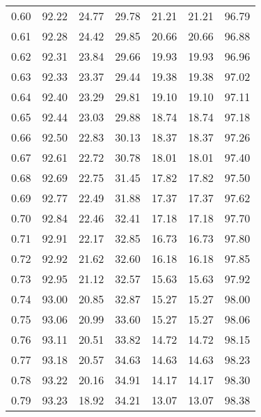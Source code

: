 \begin{tabular}{|c|c|c|c|c|c|c|}
      0.60 &     92.22 &     24.77 &      29.78 &   21.21 &      21.21 &         96.79 \\
      0.61 &     92.28 &     24.42 &      29.85 &   20.66 &      20.66 &         96.88 \\
      0.62 &     92.31 &     23.84 &      29.66 &   19.93 &      19.93 &         96.96 \\
      0.63 &     92.33 &     23.37 &      29.44 &   19.38 &      19.38 &         97.02 \\
      0.64 &     92.40 &     23.29 &      29.81 &   19.10 &      19.10 &         97.11 \\
      0.65 &     92.44 &     23.03 &      29.88 &   18.74 &      18.74 &         97.18 \\
      0.66 &     92.50 &     22.83 &      30.13 &   18.37 &      18.37 &         97.26 \\
      0.67 &     92.61 &     22.72 &      30.78 &   18.01 &      18.01 &         97.40 \\
      0.68 &     92.69 &     22.75 &      31.45 &   17.82 &      17.82 &         97.50 \\
      0.69 &     92.77 &     22.49 &      31.88 &   17.37 &      17.37 &         97.62 \\
      0.70 &     92.84 &     22.46 &      32.41 &   17.18 &      17.18 &         97.70 \\
      0.71 &     92.91 &     22.17 &      32.85 &   16.73 &      16.73 &         97.80 \\
      0.72 &     92.92 &     21.62 &      32.60 &   16.18 &      16.18 &         97.85 \\
      0.73 &     92.95 &     21.12 &      32.57 &   15.63 &      15.63 &         97.92 \\
      0.74 &     93.00 &     20.85 &      32.87 &   15.27 &      15.27 &         98.00 \\
      0.75 &     93.06 &     20.99 &      33.60 &   15.27 &      15.27 &         98.06 \\
      0.76 &     93.11 &     20.51 &      33.82 &   14.72 &      14.72 &         98.15 \\
      0.77 &     93.18 &     20.57 &      34.63 &   14.63 &      14.63 &         98.23 \\
      0.78 &     93.22 &     20.16 &      34.91 &   14.17 &      14.17 &         98.30 \\
      0.79 &     93.23 &     18.92 &      34.21 &   13.07 &      13.07 &         98.38 \\

\end{tabular}
